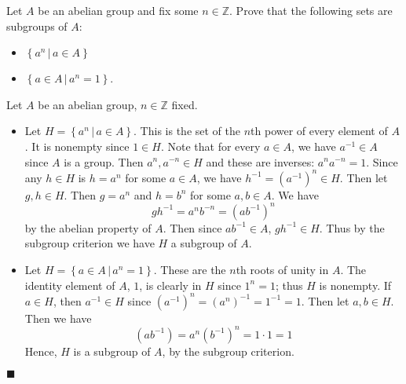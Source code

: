 \documentclass[12pt]{article}
\renewcommand{\qed}{\hfill$\blacksquare$}
\renewenvironment{proof}{\begin{addmargin}[1em]{0em}\begin{newproof}}{\end{newproof}\end{addmargin}\qed}
\newenvironment{problem}[2][Exercise]{\begin{trivlist}
\item[\hskip \labelsep {\bfseries #1}\hskip \labelsep {\bfseries #2.}]}{\end{trivlist}}
\begin{document}
\begin{problem}{2.1.12}
Let $A$ be an abelian group and fix some $n\in \mathbb{Z}$. Prove that the following sets are subgroups of $A$:
\begin{itemize}
	\item $\left\{a^n \, | \, a\in A\right\}$
	\item $\left\{a\in A\, | \, a^n = 1\right\}$.
\end{itemize}
\end{problem}
\begin{proof}
Let $A$ be an abelian group, $n\in \mathbb{Z}$ fixed.
\begin{itemize}
	\item Let $H=\left\{ a^n \, | \, a\in A\right\}$. This is the set of the $n$th power of every element of $A$. It is nonempty since $1\in H$.  Note that for every $a\in A$, we have $a^{-1} \in A$ since $A$ is a group. Then $a^n, a^{-n} \in H$ and these are inverses: $a^na^{-n} = 1$. Since any $h\in H$ is $h=a^n$ for some $a\in A$, we have $h^{-1}=\left(a^{-1}\right)^n\in H$. Then let $g,h\in H$. Then $g=a^n$ and $h=b^n$ for some $a,b \in A$. We have $$ gh^{-1}=a^nb^{-n} = \left(ab^{-1}\right)^n $$ by the abelian property of $A$. Then since $ab^{-1}\in A$, $gh^{-1} \in H$. Thus by the subgroup criterion we have $H$ a subgroup of $A$.
	\item Let $H=\left\{a\in A \, | \, a^n=1\right\}$. These are the $n$th roots of unity in $A$. The identity element of $A$, $1$, is clearly in $H$ since $1^n=1$; thus $H$ is nonempty. If $a\in H$, then $a^{-1}\in H$ since $\left(a^{-1}\right)^n = \left(a^n\right)^{-1} = 1^{-1} = 1$. Then let $a,b\in H$. Then we have $$ \left(ab^{-1}\right) = a^n \left(b^{-1}\right)^n = 1\cdot 1 = 1$$ Hence, $H$ is a subgroup of $A$, by the subgroup criterion.
\end{itemize}
\end{proof}
\end{document}
